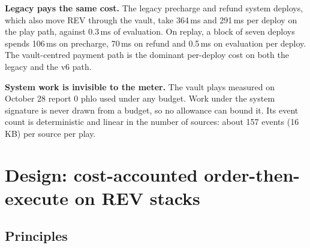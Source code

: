 \documentclass[11pt]{article}
\newcommand{\code}{\path}
\begin{document}
\textbf{Legacy \code{dev} pays the same cost.} The legacy precharge and refund system deploys, which also move REV through the vault, take 364\,ms and 291\,ms per deploy on the play path, against 0.3\,ms of evaluation. On replay, a block of seven deploys spends 106\,ms on precharge, 70\,ms on refund and 0.5\,ms on evaluation per deploy. The vault-centred payment path is the dominant per-deploy cost on both the legacy and the v6 path.

\textbf{System work is invisible to the meter.} The vault plays measured on October 28 report 0 phlo used under any budget. Work under the system signature is never drawn from a budget, so no allowance can bound it. Its event count is deterministic and linear in the number of sources: about 157 events (16\,KB) per source per play.

\section{Design: cost-accounted order-then-execute on REV stacks}\label{sec:design}

\subsection{Principles}
\end{document}
